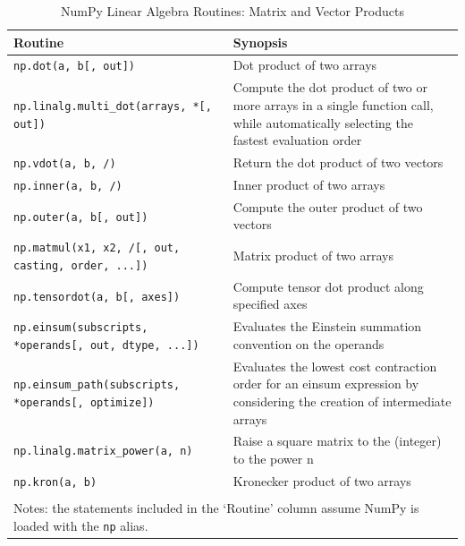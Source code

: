 \documentclass[a4paper,11pt]{book}
\begin{document}
\begin{table}
	\centering
	\caption{NumPy Linear Algebra Routines: Matrix and Vector Products}
	\label{tab:matrix_and_vector_products}
	\begin{tabular}{lp{12cm}}
		\toprule \toprule
			Routine & Synopsis \\
			\midrule
                        \texttt{np.dot(a, b[, out])}&
                        Dot product of two arrays\\
                        \texttt{np.linalg.multi\_dot(arrays, *[, out])}&
                        Compute the dot product of two or more arrays in a single function call, while automatically selecting the fastest evaluation order\\
                        \texttt{np.vdot(a, b, /)}&
                        Return the dot product of two vectors\\
                        \texttt{np.inner(a, b, /)}&
                        Inner product of two arrays\\
                        \texttt{np.outer(a, b[, out])}&
                        Compute the outer product of two vectors\\
                        \texttt{np.matmul(x1, x2, /[, out, casting, order, ...])}&
                        Matrix product of two arrays\\
                        \texttt{np.tensordot(a, b[, axes])}&
                        Compute tensor dot product along specified axes\\
                        \texttt{np.einsum(subscripts, *operands[, out, dtype, ...])}&
                        Evaluates the Einstein summation convention on the operands\\
                        \texttt{np.einsum\_path(subscripts, *operands[, optimize])}&
                        Evaluates the lowest cost contraction order for an einsum expression by considering the creation of intermediate arrays\\
                        \texttt{np.linalg.matrix\_power(a, n)}&
                        Raise a square matrix to the (integer) to the power n\\
                        \texttt{np.kron(a, b)}&
                        Kronecker product of two arrays\\
	     	\bottomrule \\[-1.8ex]
	        \multicolumn{2}{l}{Notes: the statements included in the `Routine' column assume NumPy is loaded with the \texttt{np} alias.} \\
	\end{tabular}
\end{table}
\end{document}

